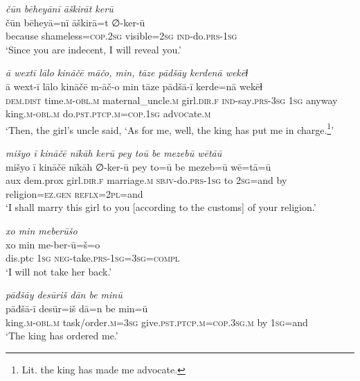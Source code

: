 \ea \label{ŽP.199}
\textit{čūn bēheyānī āškirāt kerū} \\ 
\gll čūn bēheyā=nī āškirā=t ∅-ker-ū \\ 
 because shameless\textsc{=cop}\textsc{.\textsc{2sg}} visible\textsc{=\textsc{2sg}} \textsc{ind-}do\textsc{.prs}\textsc{-\textsc{1sg}} \\ 
\glt `Since you are indecent, I will reveal you.'
\z 
 
\ea \label{ŽP.206}
\textit{ā wextī lālo kināčē māčo, min, tāze pādšāy kerdenā wekēɫ} \\ 
\gll ā wext-ī lālo kināčē m-āč-o min tāze pādšā-ī kerde=nā wekēɫ \\ 
 \textsc{dem.dist} time\textsc{.m}\textsc{-obl}\textsc{.m} maternal\_uncle\textsc{.m} girl\textsc{.dir}\textsc{.f} \textsc{ind-}say\textsc{.prs}\textsc{-3sg} \textsc{1sg} anyway king\textsc{.m}\textsc{-obl}\textsc{.m} do\textsc{.pst}\textsc{.ptcp}\textsc{.m}\textsc{=cop}\textsc{.\textsc{1sg}} ad\textsc{voc}ate\textsc{.m} \\ 
\glt `Then, the girl’s uncle said, ‘As for me, well, the king has put me in charge.\footnote{Lit. the king has made me advocate.}'
\z 
 
\ea \label{ŽP.207}
\textit{mišyo ī kināčē nīkāh kerū pey toū be mezebū wētāū} \\ 
\gll mišyo ī kināčē nīkāh ∅-ker-ū pey to=ū be mezeb=ū wē=tā=ū \\ 
 aux dem.prox girl\textsc{.dir}\textsc{.f} marriage\textsc{.m} \textsc{sbjv-}do\textsc{.prs}\textsc{-\textsc{1sg}} to \textsc{2sg}=and by religion\textsc{\textsc{=ez.gen}} \textsc{reflx}=\textsc{2pl}=and \\ 
\glt `I shall marry this girl to you [according to the customs] of your religion.'
\z 
 
\ea \label{ŽP.208}
\textit{xo min meberūšo} \\ 
\gll xo min me-ber-ū=š=o \\ 
 dis.ptc \textsc{1sg} \textsc{neg-}take\textsc{.prs}\textsc{-\textsc{1sg}}\textsc{=3sg}\textsc{=compl} \\ 
\glt `I will not take her back.'
\z 
 
\ea \label{ŽP.209}
\textit{pāđšāy desūriš dān be minū} \\ 
\gll pāđšā-ī desūr=iš dā=n be min=ū \\ 
 king\textsc{.m}\textsc{-obl}\textsc{.m} task/order\textsc{.m}\textsc{=3sg} give\textsc{.pst}\textsc{.ptcp}\textsc{.m}\textsc{=cop}\textsc{.3sg}\textsc{.m} by \textsc{1sg}=and \\ 
\glt `The king has ordered me.'
\z 
 
